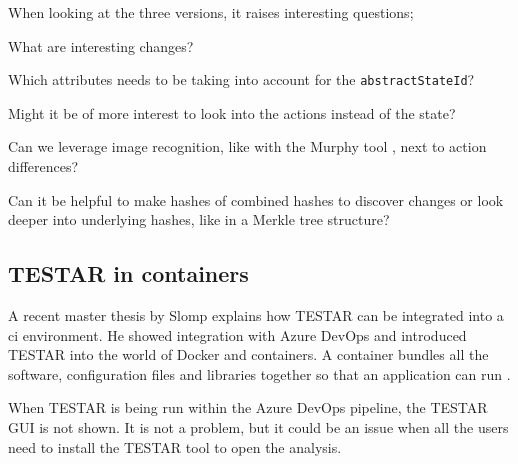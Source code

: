 When looking at the three versions, it raises interesting questions; 

What are interesting changes? 

Which attributes needs to be taking into account for the \verb|abstractStateId|? 

Might it be of more interest to look into the actions instead of the state? 

Can we leverage image recognition, like with the Murphy tool \cite{murphy-extract-gui}, next to action differences? 

Can it be helpful to make hashes of combined hashes to discover changes or look deeper into underlying hashes, like in a Merkle tree \cite{merkle-tree} structure?

\subsection{TESTAR in containers}
A recent master thesis by Slomp explains how TESTAR can be integrated into a \acrfull{ci} environment. He showed integration with Azure DevOps and introduced TESTAR into the world of Docker and containers. A container bundles all the software, configuration files and libraries together so that an application can run \cite{ms-container}. 

When TESTAR is being run within the Azure DevOps pipeline, the TESTAR GUI is not shown. It is not a problem, but it could be an issue when all the users need to install the TESTAR tool to open the analysis.  